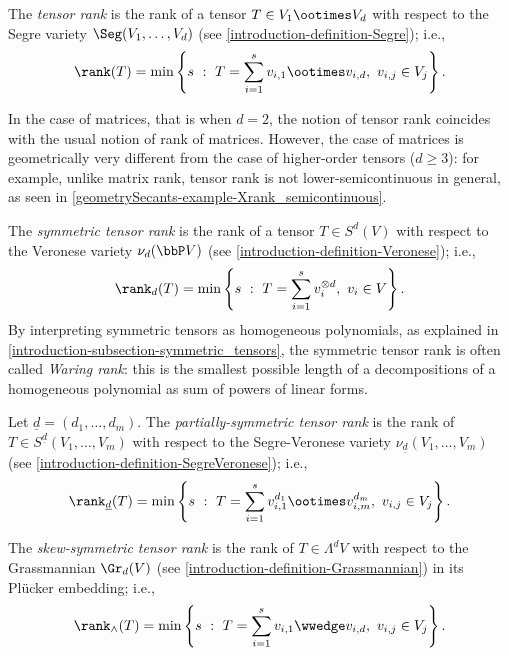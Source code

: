  \begin{definition}
 \label{geometrySecants-definition-tensor_rank}
     The \emph{tensor rank} is the rank of a tensor $T \in V_1 \ootimes V_d$ with respect to the Segre variety $\Seg(V_1,\ldots,V_d)$ (see \ref{introduction-definition-Segre}); i.e., 
     \[
         \rank(T) = \min\left\{s ~:~ T = \sum_{i=1}^s v_{i,1}\ootimes v_{i,d}, ~ v_{i,j} \in V_j\right\}.
     \]
 \end{definition}
\begin{example}
 \label{geometrySecants-example-tensor_rank}
In the case of matrices, that is when $d=2$, the notion of tensor rank coincides with the usual notion of rank of matrices. However, the case of matrices is geometrically very different from the case of higher-order tensors ($d\geq 3$): for example, unlike matrix rank, tensor rank is not lower-semicontinuous in general, as seen in \ref{geometrySecants-example-Xrank_semicontinuous}. 
\end{example}
 
 \begin{definition}
 \label{geometrySecants-definition-symmetric_tensor_rank}
     The \emph{symmetric tensor rank} is the rank of a tensor $T \in S^d(V)$ with respect to the Veronese variety $\nu_d(\bbP V)$ (see \ref{introduction-definition-Veronese}); i.e., 
     \[
         \rank_d(T) = \min\left\{s ~:~ T = \sum_{i=1}^s v_{i}^{\otimes d}, ~ v_{i} \in V\right\}.
     \]
     By interpreting symmetric tensors as homogeneous polynomials, as explained in \ref{introduction-subsection-symmetric_tensors}, the symmetric tensor rank is often called \emph{Waring rank}: this is the smallest possible length of a decompositions of a homogeneous polynomial as sum of powers of linear forms.
 \end{definition}  
 
 \begin{definition}
 \label{geometrySecants-definition-partially_symmetric_tensor_rank}
     Let $\underline{d} = (d_1,\ldots,d_m)$. The \emph{partially-symmetric tensor rank} is the rank of $T \in S^{\underline{d}}(V_1,\ldots,V_m)$ with respect to the Segre-Veronese variety $\nu_{\underline{d}}(V_1,\ldots,V_m)$ (see \ref{introduction-definition-SegreVeronese}); i.e., 
     \[
         \rank_{\underline{d}}(T) = \min\left\{s ~:~ T = \sum_{i=1}^s v_{i,1}^{d_1}\ootimes v_{i,m}^{d_m}, ~ v_{i,j} \in V_j\right\}.
     \]
 \end{definition}
 
 \begin{definition}
 \label{geometrySecants-definition-skewsymmetric_tensor_rank}
     The \emph{skew-symmetric tensor rank} is the rank of $T \in \Lambda^dV$ with respect to the Grassmannian $\Gr_d(V)$ (see \ref{introduction-definition-Grassmannian}) in its Pl\"ucker embedding; i.e., 
     \[
         \rank_{\wedge}(T) = \min\left\{s ~:~ T = \sum_{i=1}^s v_{i,1}\wwedge v_{i,d}, ~ v_{i,j} \in V_j\right\}.
     \]
 \end{definition}